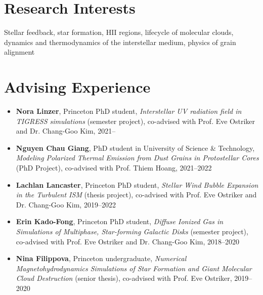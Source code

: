 \documentclass[11pt,letterpaper,roman]{moderncv}        %
\begin{document}



% 

\section{Research Interests}

Stellar feedback, star formation, HII regions, lifecycle of molecular clouds, dynamics and thermodynamics of the interstellar medium, physics of grain alignment

\section{Advising Experience}
\begin{itemize}
\setlength\itemsep{0.0em}
\item \textbf{Nora Linzer}, Princeton PhD student, \textit{Interstellar UV
    radiation field in TIGRESS simulations} (semester project), co-advised with
  Prof. Eve Ostriker and Dr. Chang-Goo Kim, 2021--
\item \textbf{Nguyen Chau Giang}, PhD student in University of Science \&
  Technology, \textit{Modeling Polarized Thermal Emission from Dust Grains in
    Protostellar Cores} (PhD Project), co-advised with Prof. Thiem Hoang,
  2021--2022
\item \textbf{Lachlan Lancaster}, Princeton PhD student, \textit{Stellar Wind
    Bubble Expansion in the Turbulent ISM} (thesis project), co-advised with
  Prof. Eve Ostriker and Dr. Chang-Goo Kim, 2019--2022
\item \textbf{Erin Kado-Fong}, Princeton PhD student, \textit{Diffuse Ionized Gas in
    Simulations of Multiphase, Star-forming Galactic Disks} (semester project),
  co-advised with Prof. Eve Ostriker and Dr. Chang-Goo Kim, 2018--2020
\item \textbf{Nina Filippova}, Princeton undergraduate, \textit{Numerical
    Magnetohydrodynamics Simulations of Star Formation and Giant Molecular Cloud
    Destruction} (senior thesis), co-advised with Prof. Eve Ostriker, 2019--2020
\end{itemize}
\end{document}
